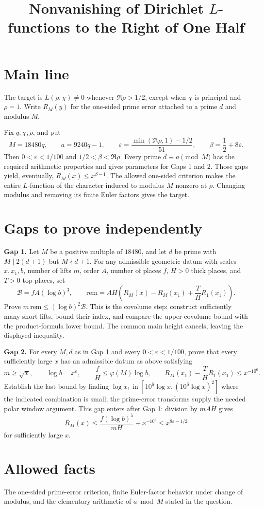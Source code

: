 \documentclass{article}
\begin{document}
\title{Nonvanishing of Dirichlet \(L\)-functions to the Right of One Half}
\author{}
\date{}
\maketitle

\section*{Main line}
The target is \(L(\rho,\chi)\ne0\) whenever \(\Re\rho>1/2\), except when \(\chi\) is principal and \(\rho=1\). Write \(R_M(y)\) for the one-sided prime error attached to a prime \(d\) and modulus \(M\).

Fix \(q,\chi,\rho\), and put
\[
 M=18480q,\qquad a=9240q-1,\qquad
 \varepsilon=\frac{\min(\Re\rho,1)-1/2}{51},\qquad
 \beta=\frac12+8\varepsilon .
\]
Then \(0<\varepsilon<1/100\) and \(1/2<\beta<\Re\rho\). Every prime \(d\equiv a\pmod M\) has the required arithmetic properties and gives parameters for Gaps 1 and 2. Those gaps yield, eventually,
\(R_M(x)\le x^{\beta-1}\). The allowed one-sided criterion makes the entire \(L\)-function of the character induced to modulus \(M\) nonzero at \(\rho\). Changing modulus and removing its finite Euler factors gives the target.

\section*{Gaps to prove independently}
\noindent\textbf{Gap 1.} Let \(M\) be a positive multiple of \(18480\), and let \(d\) be prime with \(M\mid2(d+1)\) but \(M\nmid d+1\). For any admissible geometric datum with scales \(x,x_1,b\), number of lifts \(m\), order \(A\), number of places \(f\), \(H>0\) thick places, and \(T>0\) top places, set
\[
 \mathcal B=fA(\log b)^3,\qquad
 \mathrm{rem}=AH\left(R_M(x)-R_M(x_1)+\frac TH R_1(x_1)\right).
\]
Prove \(m\,\mathrm{rem}\le(\log b)^2\mathcal B\). This is the covolume step: construct sufficiently many short lifts, bound their index, and compare the upper covolume bound with the product-formula lower bound. The common main height cancels, leaving the displayed inequality.

\medskip
\noindent\textbf{Gap 2.} For every \(M,d\) as in Gap 1 and every \(0<\varepsilon<1/100\), prove that every sufficiently large \(x\) has an admissible datum as above satisfying
\[
 m\ge\sqrt{x},\qquad \log b=x^\varepsilon,\qquad
 \frac fH\le\varphi(M)\log b,\qquad
 R_M(x_1)-\frac THR_1(x_1)\le x^{-10^6}.
\]
Establish the last bound by finding \(\log x_1\) in
\([10^6\log x,(10^6\log x)^2]\) where the indicated combination is small; the prime-error transforms supply the needed polar window argument. This gap enters after Gap 1: division by \(mAH\) gives
\[
 R_M(x)\le
 \frac{f(\log b)^5}{mH}+x^{-10^6}
 \le x^{8\varepsilon-1/2}
\]
for sufficiently large \(x\).

\section*{Allowed facts}
The one-sided prime-error criterion, finite Euler-factor behavior under change of modulus, and the elementary arithmetic of \(a\bmod M\) stated in the question.
\end{document}
